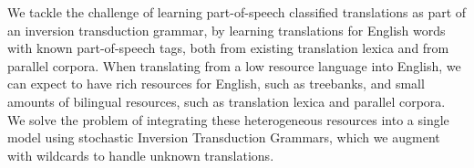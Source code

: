 We tackle the challenge of learning part-of-speech classified translations as part of an inversion transduction grammar, by learning translations for English words with known part-of-speech tags, both from existing translation lexica and from parallel corpora. When translating from a low resource language into English, we can expect to have rich resources for English, such as treebanks, and small amounts of bilingual resources, such as translation lexica and parallel corpora. We solve the problem of integrating these heterogeneous resources into a single model using stochastic Inversion Transduction Grammars, which we augment with wildcards to handle unknown translations.
